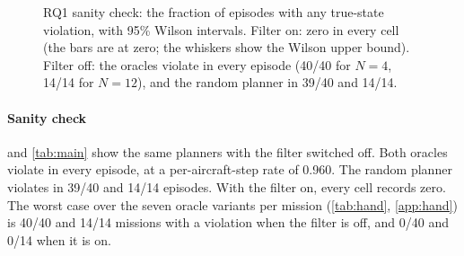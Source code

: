 \begin{figure}[t]
\centering
{}
\caption{RQ1 sanity check: the fraction of episodes with any true-state
violation, with 95\% Wilson intervals. Filter on: zero in every cell (the
bars are at zero; the whiskers show the Wilson upper bound). Filter off: the
oracles violate in every episode (40/40 for $N=4$, 14/14 for $N=12$), and
the random planner in 39/40 and 14/14.}
\label{fig:onoff}
\end{figure}

\paragraph{Sanity check}  and \cref{tab:main} show the
same planners with the filter switched off. Both oracles violate in every
episode, at a per-aircraft-step rate of 0.960. The random planner violates in
39/40 and 14/14 episodes. With the filter on, every cell records zero. The
worst case over the seven oracle variants per mission
(\cref{tab:hand}, \cref{app:hand}) is 40/40 and 14/14 missions with a
violation when the filter is off, and 0/40 and 0/14 when it is on.

